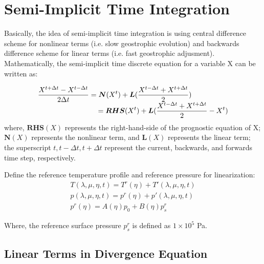 \documentclass[12pt,a4paper]{book}
\begin{document}
\section{Semi-Implicit Time Integration} \label{2.4semi-implicit}

Basically, the idea of semi-implicit time integration is using central difference scheme for nonlinear terms (i.e. slow geostrophic evolution) and backwards difference scheme for linear terms (i.e. fast geostrophic adjusment). Mathematically, the semi-implicit time discrete equation for a variable X can be written as:

	\begin{equation} \label{eq:semi-implicit-x}	
	\begin{array}{l}
	\displaystyle 
	\frac{X^{t+\Delta t} - X^{t-\Delta t}}{2\Delta t} = \boldsymbol{N} (X^t) 
	+ \boldsymbol{L} (\frac{X^{t-\Delta t} + X^{t + \Delta t}}{2}) \\
	\displaystyle 
	\hspace{7 pc}  = \boldsymbol{RHS} (X^t) + \boldsymbol{L} (\frac{X^{t-\Delta t} + X^{t + \Delta t}}{2} - X^t)
	\end{array}	
	\end{equation}
where, $\boldsymbol{RHS} (X)$ represents the right-hand-side of the prognostic equation of X; $\boldsymbol{N} (X)$ represents the nonlinear term, and $\boldsymbol{L} (X)$ represents the linear term; the superscript $t, t-\Delta t, t+\Delta t$ represent the current, backwards, and forwards time step, respectively.

Define the reference temperature profile and reference pressure for linearization:
	\begin{equation}
	\begin{array}{l}
	T(\lambda, \mu, \eta, t) = T^r(\eta) + T'(\lambda, \mu, \eta, t) \\	
	p(\lambda, \mu, \eta, t) = p^r(\eta) + p'(\lambda, \mu, \eta, t) \\
	p^r(\eta) = A(\eta)p_0 + B(\eta)p_s^r
	\end{array}	
	\end{equation}

Where, the reference surface pressure $p_s^r$ is defined as $1\times 10^{5}$ Pa.

\subsection{Linear Terms in Divergence Equation}
\end{document}
